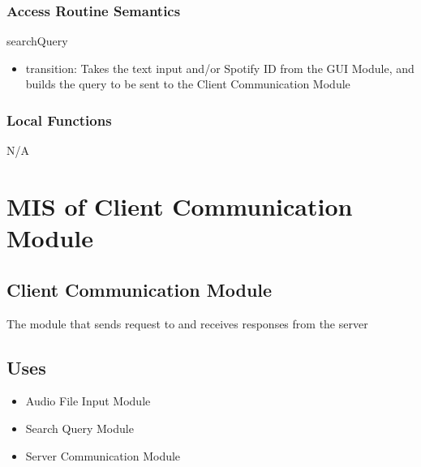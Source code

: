 \documentclass[12pt, titlepage]{article}
\begin{document}
\subsubsection{Access Routine Semantics}

\noindent searchQuery
\begin{itemize}
\item transition: Takes the text input and/or Spotify ID from the GUI Module, and builds 
the query to be sent to the Client Communication Module
\end{itemize}



\subsubsection{Local Functions}
N/A

\section{MIS of Client Communication Module} 

\subsection{Client Communication Module}
The module that sends request to and receives responses from the server

\subsection{Uses}
\begin{itemize}
  \item Audio File Input Module
  \item Search Query Module
  \item Server Communication Module
\end{itemize}
\end{document}
